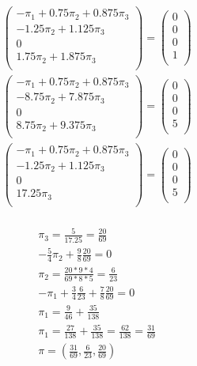 \documentclass[11px]{article}
\begin{document}
\begin{equation}
\begin{split}
& \begin{pmatrix}
-\pi_1 + 0.75 \pi_2 + 0.875 \pi_3 \\
- 1.25 \pi_2 + 1.125 \pi_3 \\
0 \\
1.75 \pi_2 + 1.875 \pi_3 \\
\end{pmatrix}
=
\begin{pmatrix}
0 \\
0 \\
0 \\
1 \\
\end{pmatrix} \\
& \begin{pmatrix}
-\pi_1 + 0.75 \pi_2 + 0.875 \pi_3 \\
- 8.75 \pi_2 + 7.875 \pi_3 \\
0 \\
8.75 \pi_2 + 9.375 \pi_3 \\
\end{pmatrix}
=
\begin{pmatrix}
0 \\
0 \\
0 \\
5 \\
\end{pmatrix} \\
& \begin{pmatrix}
-\pi_1 + 0.75 \pi_2 + 0.875 \pi_3 \\
- 1.25 \pi_2 + 1.125 \pi_3 \\
0 \\
17.25 \pi_3 \\
\end{pmatrix}
=
\begin{pmatrix}
0 \\
0 \\
0 \\
5 \\
\end{pmatrix} \\
\end{split}
\end{equation}

\begin{equation}
\begin{split}
& \pi_3 = \frac{5}{17.25} = \frac{20}{69} \\
& -\frac{5}{4} \pi_2 + \frac{9}{8}\frac{20}{69} = 0 \\
& \pi_2 = \frac{20*9*4}{69*8*5}  = \frac{6}{23} \\
& -\pi_1 + \frac{3}{4}\frac{6}{23} + \frac{7}{8}\frac{20}{69} = 0 \\
& \pi_1 = \frac{9}{46} + \frac{35}{138} \\
& \pi_1 = \frac{27}{138} + \frac{35}{138} = \frac{62}{138} = \frac{31}{69}\\
& \pi = (\frac{31}{69}, \frac{6}{23}, \frac{20}{69})\\ 
\end{split}
\end{equation}
\end{document}
